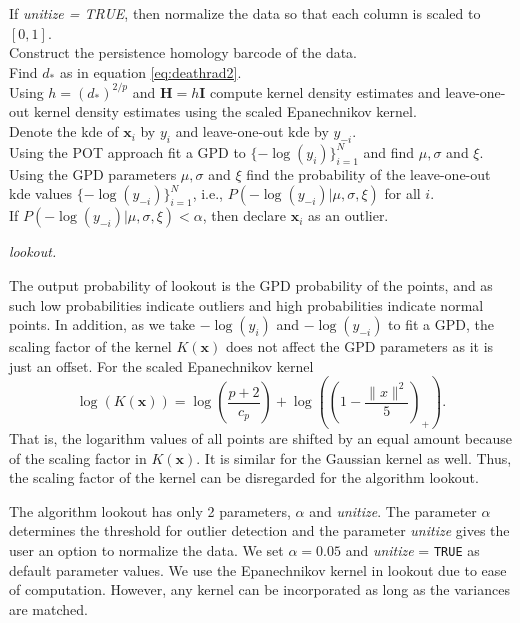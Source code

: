 \documentclass[11pt,a4paper,]{article}
\theoremstyle{definition}
\theoremstyle{definition}
\theoremstyle{definition}
\theoremstyle{remark}
\begin{document}
\begin{algorithm}\fontsize{11}{16}\selectfont
    If \textit{unitize = TRUE}, then normalize the data so that each column is scaled to $[0,1]$.\\
    Construct the persistence homology barcode of the data. \\
    Find $d_*$ as in equation \eqref{eq:deathrad2}. \\
    Using $h = (d_*)^{2/p}$ and $\bm{H} = h\bm{I}$ compute kernel density estimates and leave-one-out kernel density estimates using the scaled Epanechnikov kernel. \\
    Denote the kde of $\bm{x}_i$ by $y_i$ and leave-one-out kde by $y_{-i}$.\\
    Using the POT approach fit a GPD to $\{-\log(y_i)\}_{i=1}^N$ and find $\mu, \sigma$ and $\xi$. \\
    Using the GPD parameters $\mu, \sigma$ and $\xi$ find the probability of the leave-one-out kde values $\{-\log(y_{-i})\}_{i=1}^N$, i.e., $P\left(-\log(y_{-i})|\mu, \sigma, \xi \right)$ for all $i$. \\
    If $P\left(-\log(y_{-i})|\mu, \sigma, \xi \right) < \alpha$, then declare $\bm{x}_i$ as an outlier.
    \caption{\itshape lookout.}
    \label{algo:lookout}
\end{algorithm}

The output probability of lookout is the GPD probability of the points, and as such low probabilities indicate outliers and high probabilities indicate normal points. In addition, as we take \(-\log(y_i)\) and \(-\log(y_{-i})\) to fit a GPD, the scaling factor of the kernel \(K(\bm{x})\) does not affect the GPD parameters as it is just an offset. For the scaled Epanechnikov kernel
\begin{equation}\label{eq:lookout1}
    \log(K(\bm{x})) = \log\left( \frac{p+2}{c_p}\right) + \log\left( \left(1 -\frac{\| x \|^2}{5} \right)_+\right) .
\end{equation}
That is, the logarithm values of all points are shifted by an equal amount because of the scaling factor in \(K(\bm{x})\). It is similar for the Gaussian kernel as well. Thus, the scaling factor of the kernel can be disregarded for the algorithm lookout.

The algorithm lookout has only 2 parameters, \(\alpha\) and \emph{unitize}. The parameter \(\alpha\) determines the threshold for outlier detection and the parameter \emph{unitize} gives the user an option to normalize the data. We set \(\alpha= 0.05\) and \emph{unitize} = \texttt{TRUE} as default parameter values. We use the Epanechnikov kernel in lookout due to ease of computation. However, any kernel can be incorporated as long as the variances are matched.
\end{document}
